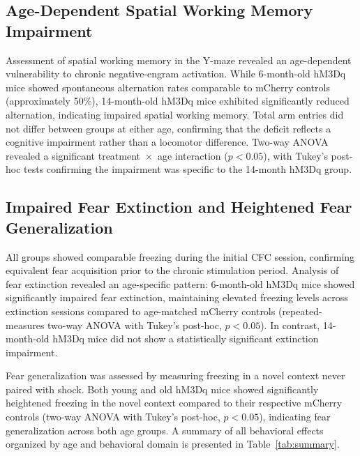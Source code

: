 \documentclass[11pt]{article}
\begin{document}
\subsection{Age-Dependent Spatial Working Memory Impairment}

Assessment of spatial working memory in the Y-maze revealed an age-dependent vulnerability to chronic negative-engram activation. While 6-month-old hM3Dq mice showed spontaneous alternation rates comparable to mCherry controls (approximately 50\%), 14-month-old hM3Dq mice exhibited significantly reduced alternation, indicating impaired spatial working memory. Total arm entries did not differ between groups at either age, confirming that the deficit reflects a cognitive impairment rather than a locomotor difference. Two-way ANOVA revealed a significant treatment~$\times$~age interaction ($p < 0.05$), with Tukey's post-hoc tests confirming the impairment was specific to the 14-month hM3Dq group.

\subsection{Impaired Fear Extinction and Heightened Fear Generalization}

All groups showed comparable freezing during the initial CFC session, confirming equivalent fear acquisition prior to the chronic stimulation period. Analysis of fear extinction revealed an age-specific pattern: 6-month-old hM3Dq mice showed significantly impaired fear extinction, maintaining elevated freezing levels across extinction sessions compared to age-matched mCherry controls (repeated-measures two-way ANOVA with Tukey's post-hoc, $p < 0.05$). In contrast, 14-month-old hM3Dq mice did not show a statistically significant extinction impairment.

Fear generalization was assessed by measuring freezing in a novel context never paired with shock. Both young and old hM3Dq mice showed significantly heightened freezing in the novel context compared to their respective mCherry controls (two-way ANOVA with Tukey's post-hoc, $p < 0.05$), indicating fear generalization across both age groups. A summary of all behavioral effects organized by age and behavioral domain is presented in Table~\ref{tab:summary}.
\end{document}

